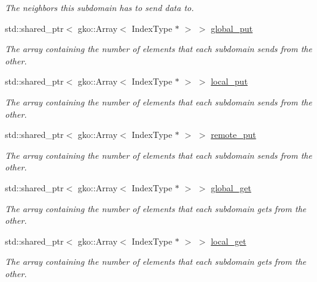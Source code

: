 \begin{DoxyCompactItemize}
\begin{DoxyCompactList}\small\item\em The neighbors this subdomain has to send data to. \end{DoxyCompactList}\item 
std\+::shared\+\_\+ptr$<$ gko\+::\+Array$<$ Index\+Type $\ast$ $>$ $>$ \hyperlink{structschwz_1_1Communicate_1_1comm__struct_a9186bd26e5826aa6ad88c863798593ac}{global\+\_\+put}
\begin{DoxyCompactList}\small\item\em The array containing the number of elements that each subdomain sends from the other. \end{DoxyCompactList}\item 
std\+::shared\+\_\+ptr$<$ gko\+::\+Array$<$ Index\+Type $\ast$ $>$ $>$ \hyperlink{structschwz_1_1Communicate_1_1comm__struct_ace7588b81dd2aa7a84e118df8137252b}{local\+\_\+put}
\begin{DoxyCompactList}\small\item\em The array containing the number of elements that each subdomain sends from the other. \end{DoxyCompactList}\item 
std\+::shared\+\_\+ptr$<$ gko\+::\+Array$<$ Index\+Type $\ast$ $>$ $>$ \hyperlink{structschwz_1_1Communicate_1_1comm__struct_a206d13b093699bf04bd1efb51c4290f2}{remote\+\_\+put}
\begin{DoxyCompactList}\small\item\em The array containing the number of elements that each subdomain sends from the other. \end{DoxyCompactList}\item 
std\+::shared\+\_\+ptr$<$ gko\+::\+Array$<$ Index\+Type $\ast$ $>$ $>$ \hyperlink{structschwz_1_1Communicate_1_1comm__struct_a4166e2bb75eeaf48ee39ca7cdc3adb01}{global\+\_\+get}
\begin{DoxyCompactList}\small\item\em The array containing the number of elements that each subdomain gets from the other. \end{DoxyCompactList}\item 
std\+::shared\+\_\+ptr$<$ gko\+::\+Array$<$ Index\+Type $\ast$ $>$ $>$ \hyperlink{structschwz_1_1Communicate_1_1comm__struct_ab4e91a457646f43106da98a58c332754}{local\+\_\+get}
\begin{DoxyCompactList}\small\item\em The array containing the number of elements that each subdomain gets from the other. \end{DoxyCompactList}\item 

\end{DoxyCompactItemize}
